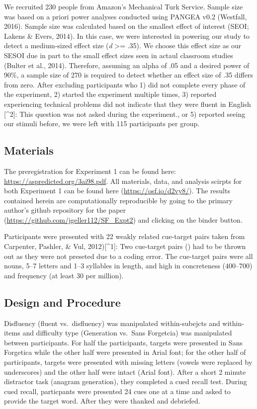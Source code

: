 \documentclass[pdf]{apa6}
\begin{document}
We recruited 230 people from Amazon's Mechanical Turk Service. Sample size was based on a priori power analyses conducted using PANGEA v0.2 (Westfall, 2016). Sample size was calculated based on the smallest effect of interest (SEOI; Lakens \& Evers, 2014). In this case, we were interested in powering our study to detect a medium-sized effect size (\emph{d} \textgreater{}= .35). We choose this effect size as our SESOI due in part to the small effect sizes seen in actaul classroom studies (Bulter et al., 2014). Therefore, assuming an alpha of .05 and a desired power of 90\%, a sample size of 270 is required to detect whether an effect size of .35 differs from zero. After excluding participants who 1) did not complete every phase of the experiment, 2) started the experiment multiple times, 3) reported experiencing technical problems did not indicate that they were fluent in English {[}\^{}2{]}: This question was not asked during the experiment., or 5) reported seeing our stimuli before, we were left with 115 participants per group.

\hypertarget{materials}{%
\subsection{Materials}\label{materials}}

The preregistration for Experiment 1 can be found here: \url{https://aspredicted.org/3ai98.pdf}. All materials, data, and analysis scirpts for both Experiment 1 can be found here (\url{https://osf.io/d2vy8/}). The results contained herein are computationally reproducible by going to the primary author's github repository for the paper (\url{https://github.com/jgeller112/SF_Expt2}) and clicking on the binder button.

Participants were presented with 22 weakly related cue-target pairs taken from Carpenter, Pashler, \& Vul, 2012){[}\^{}1{]}: Two cue-target pairs () had to be thrown out as they were not preseted due to a coding error. The cue-target pairs were all nouns, 5--7 letters and 1--3 syllables in length, and high in concreteness (400--700) and frequency (at least 30 per million).

\hypertarget{design-and-procedure}{%
\subsection{Design and Procedure}\label{design-and-procedure}}

Disfluency (fluent vs.~disfluency) was manipulated within-subejcts and within-items and difficulty type (Generation vs.~Sans Forgetcia) was manipulated between participants. For half the participants, targets were presented in Sans Forgetica while the other half were presented in Arial font; for the other half of participants, targets were presented with missing letters (vowels were replaced by underscores) and the other half were intact (Arial font). After a short 2 minute distractor task (anagram generation), they completed a cued recall test. During cued recall, particpants were presented 24 cues one at a time and asked to provide the target word. After they were thanked and debriefed.
\end{document}
